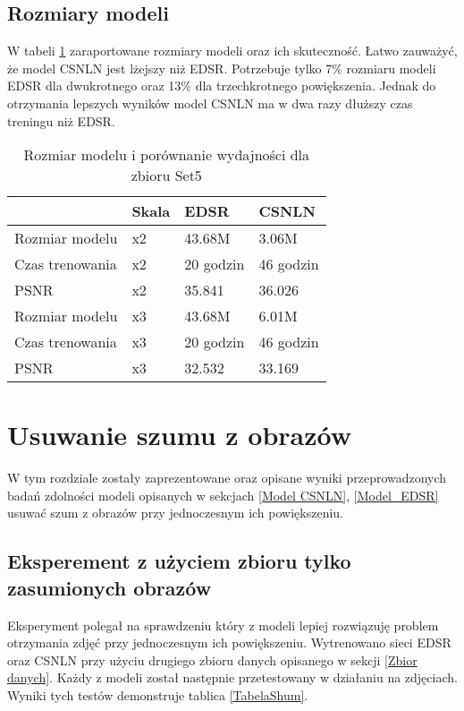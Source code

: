 \documentclass[a4paper,12pt,twoside,openany]{report}
\begin{document}
\section{Rozmiary modeli}
	W tabeli \ref{TabelaSizeOfModels} zaraportowane rozmiary modeli oraz ich skuteczność. Łatwo zauważyć, że model CSNLN jest lżejszy niż EDSR. Potrzebuje tylko 7\% rozmiaru modeli EDSR dla dwukrotnego oraz 13\% dla trzechkrotnego powiększenia. Jednak do otrzymania lepszych wyników model CSNLN ma w dwa razy dłuższy czas treningu niż EDSR. 
		\begin{table}[!htbp] 
			\centering
			\begin{tabular}{ |p{5cm}||p{1cm}|p{2cm}|p{2cm}|  }
				\hline
				& Skala & EDSR &  CSNLN \\
				\hline		
				Rozmiar modelu                            &   x2  &  43.68M    &  3.06M \\
				Czas trenowania							  &   x2  &  20 godzin &  46 godzin\\
				PSNR								      &   x2  &  35.841    &  36.026\\
				\hline
				Rozmiar modelu                            &   x3  &  43.68M    &   6.01M\\
				Czas trenowania							  &   x3  &  20 godzin &  46 godzin\\
				PSNR								      &   x3  &  32.532    &  33.169\\
				\hline
				
			\end{tabular}
			\caption{Rozmiar modelu i porównanie wydajności dla zbioru Set5}
			\label{TabelaSizeOfModels}
		\end{table}

\newpage
\chapter{Usuwanie szumu z obrazów}
W tym rozdziale zostały zaprezentowane oraz opisane wyniki przeprowadzonych badań zdolności modeli opisanych w sekcjach \ref{Model CSNLN}, \ref{Model_EDSR} usuwać szum z obrazów przy jednoczesnym ich powiększeniu.
\section{Eksperement z użyciem zbioru tylko zasumionych obrazów}
  
	Eksperyment polegał na sprawdzeniu który z modeli lepiej rozwiązuję problem otrzymania zdjęć przy jednoczesnym ich powiększeniu. Wytrenowano sieci EDSR oraz CSNLN przy użyciu drugiego zbioru danych opisanego w sekcji \ref{Zbior danych}. Każdy z modeli został następnie przetestowany w działaniu na zdjęciach. Wyniki tych testów demonstruje tablica \ref{TabelaShum}.
	
\end{document}
